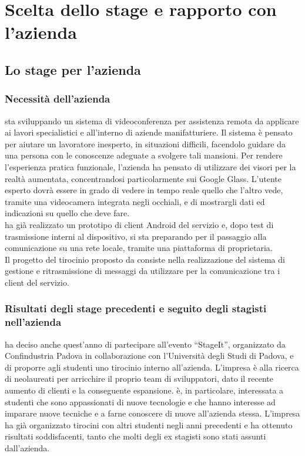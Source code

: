 \chapter{Scelta dello stage e rapporto con l'azienda}

\section{Lo stage per l'azienda}

   \subsection{Necessità dell'azienda}
   \nomeAzienda{} sta sviluppando un sistema di videoconferenza per assistenza remota da applicare ai lavori specialistici e all'interno di aziende manifatturiere. Il sistema è pensato per aiutare un lavoratore inesperto, in situazioni difficili, facendolo guidare da una persona con le conoscenze adeguate a svolgere tali mansioni. Per rendere l'esperienza pratica funzionale, l'azienda ha pensato di utilizzare dei visori per la realtà aumentata, concentrandosi particolarmente sui Google Glass. L'utente esperto dovrà essere in grado di vedere in tempo reale quello che l'altro vede, tramite una videocamera integrata negli occhiali, e di mostrargli dati ed indicazioni su quello che deve fare.
   \\
   \nomeAzienda{} ha già realizzato un prototipo di client Android del servizio e, dopo test di trasmissione interni al dispositivo, si sta preparando per il passaggio alla comunicazione su una rete locale, tramite una piattaforma di   proprietaria.
   \\
   Il progetto del tirocinio proposto da \nomeAzienda{} consiste nella realizzazione del sistema di gestione e ritrasmissione di messaggi da utilizzare per la comunicazione tra i client del servizio.

   \subsection{Risultati degli stage precedenti e seguito degli stagisti nell'azienda}
   \nomeAzienda{} ha deciso anche quest'anno di partecipare all'evento ``StageIt'', organizzato da Confindustria Padova in collaborazione con l'Università degli Studi di Padova, e di proporre agli studenti uno tirocinio interno all'azienda. L'impresa è alla ricerca di neolaureati per arricchire il proprio team di sviluppatori, dato il recente aumento di clienti e la conseguente espansione. 
   \nomeAzienda{} è, in particolare, interessata a studenti che sono appassionati di nuove tecnologie e che hanno interesse ad imparare nuove tecniche e a farne conoscere di nuove all'azienda stessa.
   L'impresa ha già organizzato tirocini con altri studenti negli anni precedenti e ha ottenuto risultati soddisfacenti, tanto che molti degli ex stagisti sono stati assunti dall'azienda.

